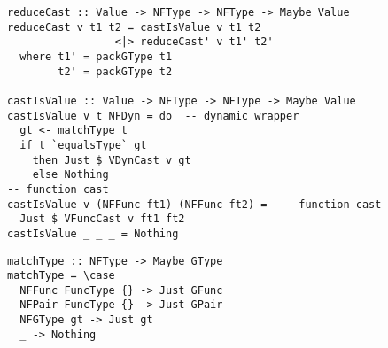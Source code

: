 \begin{lstlisting}[float,
  caption=Rule \textsc{Cast-Is-Value} (\texttt{Interpreter.hs}),
  label=lst:cast-is-value]
reduceCast :: Value -> NFType -> NFType -> Maybe Value
reduceCast v t1 t2 = castIsValue v t1 t2
                 <|> reduceCast' v t1' t2'
  where t1' = packGType t1
        t2' = packGType t2

castIsValue :: Value -> NFType -> NFType -> Maybe Value
castIsValue v t NFDyn = do  -- dynamic wrapper
  gt <- matchType t
  if t `equalsType` gt
    then Just $ VDynCast v gt
    else Nothing
-- function cast
castIsValue v (NFFunc ft1) (NFFunc ft2) =  -- function cast
  Just $ VFuncCast v ft1 ft2
castIsValue _ _ _ = Nothing
\end{lstlisting}

\begin{lstlisting}[float,
  caption={Match type function $\rhd$ (\texttt{Interpreter.hs})},
  label=lst:match-type]
matchType :: NFType -> Maybe GType
matchType = \case
  NFFunc FuncType {} -> Just GFunc
  NFPair FuncType {} -> Just GPair
  NFGType gt -> Just gt
  _ -> Nothing
\end{lstlisting}
